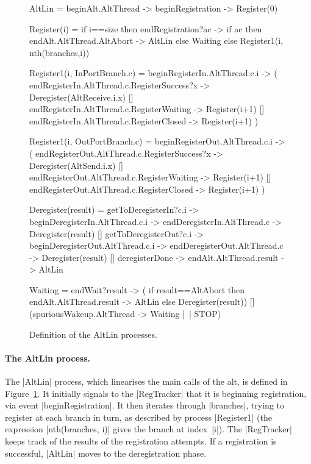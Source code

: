 \begin{figure}
\begin{cspm}
AltLin = beginAlt.AltThread -> beginRegistration -> Register(0)
  
Register(i) = 
  if i==size then endRegistration?ac -> 
    if ac then endAlt.AltThread.AltAbort -> AltLin else Waiting
  else Register1(i, nth(branches,i))
  
Register1(i, InPortBranch.c) = 
  beginRegisterIn.AltThread.c.i -> (
    endRegisterIn.AltThread.c.RegisterSuccess?x -> Deregister(AltReceive.i.x)
    [] endRegisterIn.AltThread.c.RegisterWaiting -> Register(i+1)
    [] endRegisterIn.AltThread.c.RegisterClosed -> Register(i+1)
  )

Register1(i, OutPortBranch.c) =
  beginRegisterOut.AltThread.c.i -> (
    endRegisterOut.AltThread.c.RegisterSuccess?x -> Deregister(AltSend.i.x)
    [] endRegisterOut.AltThread.c.RegisterWaiting -> Register(i+1)
    [] endRegisterOut.AltThread.c.RegisterClosed -> Register(i+1)
  )
  
Deregister(result) =
  getToDeregisterIn?c.i -> beginDeregisterIn.AltThread.c.i -> 
     endDeregisterIn.AltThread.c -> Deregister(result)
  [] getToDeregisterOut?c.i -> beginDeregisterOut.AltThread.c.i ->
     endDeregisterOut.AltThread.c -> Deregister(result)
  [] deregisterDone -> endAlt.AltThread.result -> AltLin
  
Waiting = 
  endWait?result -> (
    if result==AltAbort then endAlt.AltThread.result -> AltLin
    else Deregister(result))
  [] (spuriousWakeup.AltThread -> Waiting |~| STOP)
\end{cspm}
\caption{Definition of the {\scalastyle AltLin}
  processes.  \label{fig:AltLin}} 
\end{figure}


\paragraph{The {\scalashape AltLin} process.}

The |AltLin| process, which linearises the main calls of the alt, is defined
in Figure~\ref{fig:AltLin}. It initially signals to the |RegTracker| that it
is beginning registration, via event |beginRegistration|.  It then iterates
through |branches|, trying to register at each branch in turn, as described by
process |Register1| (the expression |nth(branches, i)| gives the branch at
index~|i|).  The |RegTracker| keeps track of the results of the registration
attempts.  If a registration is successful, |AltLin| moves to the
deregistration phase.

